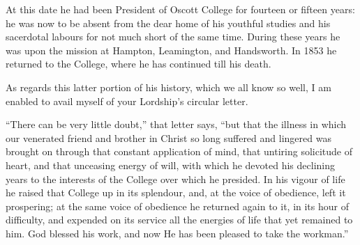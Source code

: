 At this date he had been President of Oscott College
for fourteen or fifteen years: he was now to be absent
from the dear home of his youthful studies and his
sacerdotal labours for not much short of the same time.
During these years he was upon the mission at Hampton,
Leamington, and Handsworth. In 1853 he returned to the
College, where he has continued till his death.

As regards this latter portion of his history, which
we all know so well, I am enabled to avail myself of your
Lordship's circular letter.

``There can be very little doubt,'' that
letter says, ``but that the illness in which our
venerated friend and brother in Christ so long suffered
and lingered was brought on through that constant
application of mind, that untiring solicitude of heart,
and that unceasing energy of will, with which he devoted
his declining years to the interests of the College over
which he presided. In his vigour of life he raised that
College up in its splendour, and, at the voice of
obedience, left it prospering; at the same voice of
obedience he returned again to it, in its hour of
difficulty, and expended on its service all the energies
of life that yet remained to him. God blessed his work,
and now He has been pleased to take the workman.''

